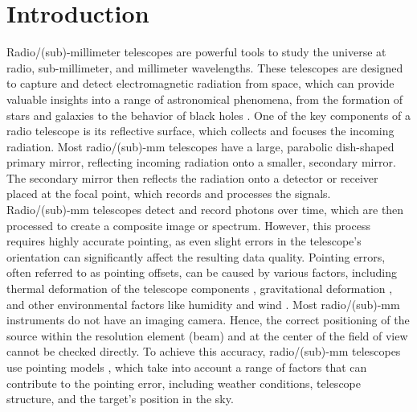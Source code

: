 \section{Introduction}
Radio/(sub)-millimeter telescopes are powerful tools to study the universe at radio, sub-millimeter, and millimeter wavelengths.
These telescopes are designed to capture and detect electromagnetic radiation from space, which can provide valuable insights into a range of astronomical phenomena,
from the formation of stars \cite{Haarsma2000} and galaxies \cite{Breugel1999} to the behavior of black holes \cite{Coriat2011}.
One of the key components of a radio telescope is its reflective surface, which collects and focuses the incoming radiation.
Most radio/(sub)-mm telescopes have a large, parabolic dish-shaped primary mirror, reflecting incoming radiation onto a smaller, secondary mirror.
The secondary mirror then reflects the radiation onto a detector or receiver placed at the focal point, which records and processes the signals.\\

Radio/(sub)-mm telescopes detect and record photons over time, which are then processed to create a composite image or spectrum.
However, this process requires highly accurate pointing, as even slight errors in the telescope's orientation can significantly affect the resulting data quality.
Pointing errors, often referred to as pointing offsets, can be caused by various factors, including thermal deformation of the telescope components \cite{Dong2018},
gravitational deformation \cite{GravDeformation}, and other environmental factors like humidity \cite{Corstanje2017} and wind \cite{Gawronski2005}.
Most radio/(sub)-mm instruments do not have an imaging camera.
Hence, the correct positioning of the source within the resolution element (beam) and at the center of the field of view cannot be checked directly.
To achieve this accuracy, radio/(sub)-mm telescopes use pointing models \cite{stumpff1972}, which take into account a range of factors that can contribute to the pointing error,
including weather conditions, telescope structure, and the target's position in the sky.\\

